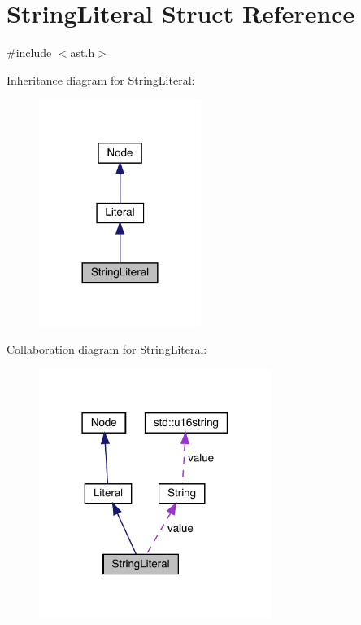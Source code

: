 \hypertarget{struct_string_literal}{}\section{String\+Literal Struct Reference}
\label{struct_string_literal}


{\ttfamily \#include $<$ast.\+h$>$}



Inheritance diagram for String\+Literal\+:
\nopagebreak
\begin{figure}[H]
\begin{center}
\leavevmode
\includegraphics[width=149pt]{struct_string_literal__inherit__graph}
\end{center}
\end{figure}


Collaboration diagram for String\+Literal\+:
\nopagebreak
\begin{figure}[H]
\begin{center}
\leavevmode
\includegraphics[width=214pt]{struct_string_literal__coll__graph}
\end{center}
\end{figure}
